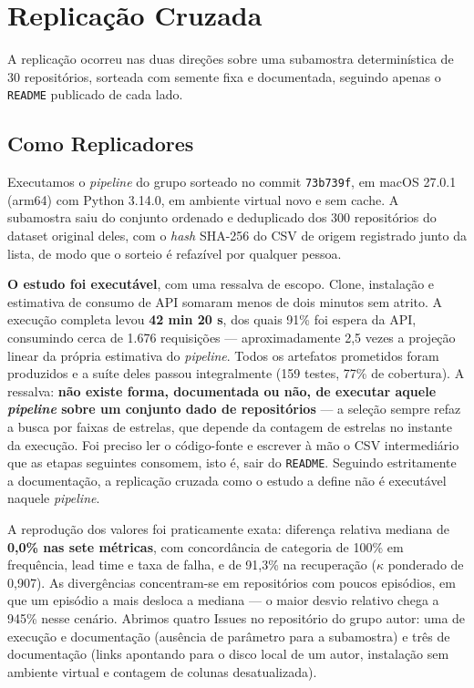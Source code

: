 \section{Replicação Cruzada}
\label{sec:replicacao}

A replicação ocorreu nas duas direções sobre uma subamostra determinística de 30
repositórios, sorteada com semente fixa e documentada, seguindo apenas o \texttt{README}
publicado de cada lado.

\subsection{Como Replicadores}

Executamos o \emph{pipeline} do grupo sorteado no commit \texttt{73b739f}, em macOS 27.0.1
(arm64) com Python 3.14.0, em ambiente virtual novo e sem cache. A subamostra saiu do
conjunto ordenado e deduplicado dos 300 repositórios do dataset original deles, com o
\emph{hash} SHA-256 do CSV de origem registrado junto da lista, de modo que o sorteio é
refazível por qualquer pessoa.

\textbf{O estudo foi executável}, com uma ressalva de escopo. Clone, instalação e estimativa
de consumo de API somaram menos de dois minutos sem atrito. A execução completa levou
\textbf{42 min 20 s}, dos quais 91\% foi espera da API, consumindo cerca de 1.676 requisições
--- aproximadamente 2,5 vezes a projeção linear da própria estimativa do \emph{pipeline}.
Todos os artefatos prometidos foram produzidos e a suíte deles passou integralmente (159
testes, 77\% de cobertura). A ressalva: \textbf{não existe forma, documentada ou não, de
executar aquele \emph{pipeline} sobre um conjunto dado de repositórios} --- a seleção sempre
refaz a busca por faixas de estrelas, que depende da contagem de estrelas no instante da
execução. Foi preciso ler o código-fonte e escrever à mão o CSV intermediário que as etapas
seguintes consomem, isto é, sair do \texttt{README}. Seguindo estritamente a documentação, a
replicação cruzada como o estudo a define não é executável naquele \emph{pipeline}.

A reprodução dos valores foi praticamente exata: diferença relativa mediana de
\textbf{0,0\% nas sete métricas}, com concordância de categoria de 100\% em frequência, lead
time e taxa de falha, e de 91,3\% na recuperação ($\kappa$ ponderado de 0,907). As divergências
concentram-se em repositórios com poucos episódios, em que um episódio a mais desloca a
mediana --- o maior desvio relativo chega a 945\% nesse cenário. Abrimos quatro Issues no
repositório do grupo autor: uma de execução e documentação (ausência de parâmetro para a
subamostra) e três de documentação (links apontando para o disco local de um autor,
instalação sem ambiente virtual e contagem de colunas desatualizada).

